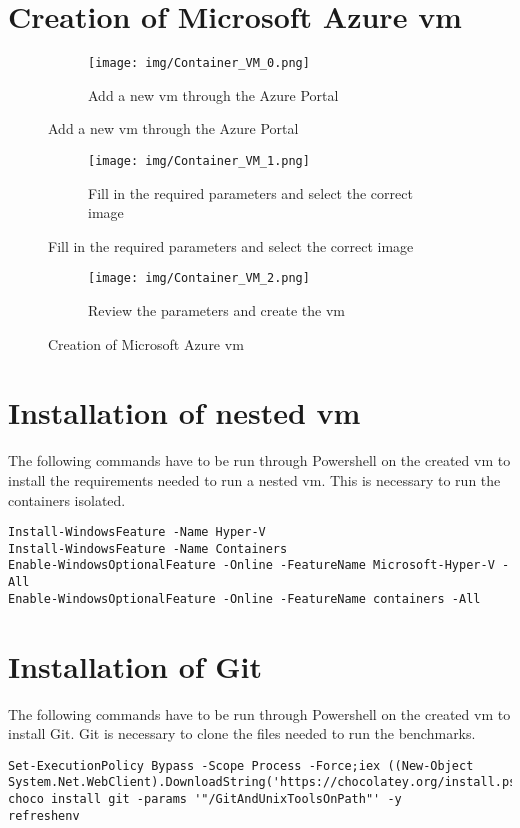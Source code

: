 \label{Containers_Azure}
\section{Creation of Microsoft Azure \acrshort{vm}}
\begin{figure}[h]
	\begin{subfigure}{\textwidth}
		\captionsetup{width=0.9\linewidth}
		\texttt{[image: img/Container\_VM\_0.png]} 
		\centering
		\caption{Add a new \acrshort{vm} through the Azure Portal}
		\label{fig:Container_VM_0}
	\end{subfigure}
\end{figure}
\begin{figure}[h]\ContinuedFloat
	\begin{subfigure}{\textwidth}
		\captionsetup{width=0.9\linewidth}
		\texttt{[image: img/Container\_VM\_1.png]}
		\centering
		\caption{Fill in the required parameters and select the correct image}
		\label{fig:Container_VM_1}
	\end{subfigure}
\end{figure}
\begin{figure}[h]\ContinuedFloat
	\begin{subfigure}{\textwidth}
		\captionsetup{width=0.9\linewidth}
		\texttt{[image: img/Container\_VM\_2.png]}
		\centering
		\caption{Review the parameters and create the \acrshort{vm}}
		\label{fig:Container_VM_2}
	\end{subfigure}
	\caption{Creation of Microsoft Azure \acrshort{vm}}
	\label{fig:Container_VM}
\end{figure}
\clearpage
\section{Installation of nested \acrshort{vm}}
The following commands have to be run through Powershell on the created \acrshort{vm} to install the requirements needed to run a nested \acrshort{vm}. This is necessary to run the containers isolated.
\begin{lstlisting}[breaklines]
Install-WindowsFeature -Name Hyper-V
Install-WindowsFeature -Name Containers
Enable-WindowsOptionalFeature -Online -FeatureName Microsoft-Hyper-V -All
Enable-WindowsOptionalFeature -Online -FeatureName containers -All
\end{lstlisting}
\section{Installation of Git}
The following commands have to be run through Powershell on the created \acrshort{vm} to install Git. Git is necessary to clone the files needed to run the benchmarks.
\begin{lstlisting}[breaklines]
Set-ExecutionPolicy Bypass -Scope Process -Force;iex ((New-Object System.Net.WebClient).DownloadString('https://chocolatey.org/install.ps1'))
choco install git -params '"/GitAndUnixToolsOnPath"' -y
refreshenv
\end{lstlisting}
